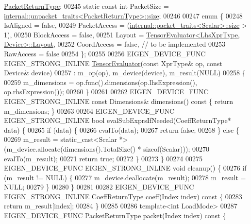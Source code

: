 \begin{DoxyCode}
      \hyperlink{group___sparse_core___module}{PacketReturnType};
00245   \textcolor{keyword}{static} \textcolor{keyword}{const} \textcolor{keywordtype}{int} PacketSize = 
      \hyperlink{struct_eigen_1_1internal_1_1unpacket__traits}{internal::unpacket\_traits<PacketReturnType>::size};
00246 
00247   \textcolor{keyword}{enum} \{
00248     IsAligned = \textcolor{keyword}{false},
00249     PacketAccess = (\hyperlink{struct_eigen_1_1internal_1_1packet__traits}{internal::packet\_traits<Scalar>::size} > 1),
00250     BlockAccess = \textcolor{keyword}{false},
00251     Layout = \hyperlink{struct_eigen_1_1_tensor_evaluator}{TensorEvaluator<LhsXprType, Device>::Layout},
00252     CoordAccess = \textcolor{keyword}{false},  \textcolor{comment}{// to be implemented}
00253     RawAccess = \textcolor{keyword}{false}
00254   \};
00255 
00256   EIGEN\_DEVICE\_FUNC EIGEN\_STRONG\_INLINE \hyperlink{struct_eigen_1_1_tensor_evaluator}{TensorEvaluator}(\textcolor{keyword}{const} XprType& op, \textcolor{keyword}{const} Device& 
      device)
00257       : m\_op(op), m\_device(device), m\_result(NULL)
00258   \{
00259     m\_dimensions = op.func().dimensions(op.lhsExpression(), op.rhsExpression());
00260   \}
00261 
00262   EIGEN\_DEVICE\_FUNC EIGEN\_STRONG\_INLINE \textcolor{keyword}{const} Dimensions& dimensions()\textcolor{keyword}{ const }\{ \textcolor{keywordflow}{return} m\_dimensions; \}
00263 
00264   EIGEN\_DEVICE\_FUNC EIGEN\_STRONG\_INLINE \textcolor{keywordtype}{bool} evalSubExprsIfNeeded(CoeffReturnType* data) \{
00265     \textcolor{keywordflow}{if} (data) \{
00266       evalTo(data);
00267       \textcolor{keywordflow}{return} \textcolor{keyword}{false};
00268     \} \textcolor{keywordflow}{else} \{
00269       m\_result = \textcolor{keyword}{static\_cast<}Scalar *\textcolor{keyword}{>}(m\_device.allocate(dimensions().TotalSize() * \textcolor{keyword}{sizeof}(Scalar)));
00270       evalTo(m\_result);
00271       \textcolor{keywordflow}{return} \textcolor{keyword}{true};
00272     \}
00273   \}
00274 
00275   EIGEN\_DEVICE\_FUNC EIGEN\_STRONG\_INLINE \textcolor{keywordtype}{void} cleanup() \{
00276     \textcolor{keywordflow}{if} (m\_result != NULL) \{
00277       m\_device.deallocate(m\_result);
00278       m\_result = NULL;
00279     \}
00280   \}
00281 
00282   EIGEN\_DEVICE\_FUNC EIGEN\_STRONG\_INLINE CoeffReturnType coeff(Index index)\textcolor{keyword}{ const }\{
00283     \textcolor{keywordflow}{return} m\_result[index];
00284   \}
00285 
00286   \textcolor{keyword}{template}<\textcolor{keywordtype}{int} LoadMode>
00287   EIGEN\_DEVICE\_FUNC PacketReturnType packet(Index index)\textcolor{keyword}{ const }\{

\end{DoxyCode}
